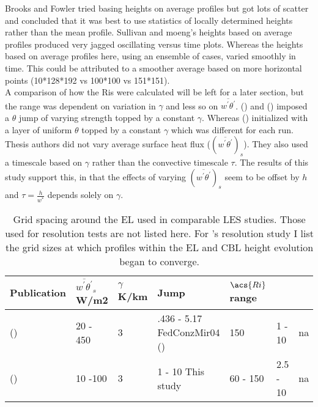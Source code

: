 Brooks and Fowler tried basing heights on average profiles but got lots of scatter and concluded that it was best to use statistics of locally determined heights rather than the mean profile.  Sullivan and moeng's heights based on average profiles produced very jagged oscillating versus time plots. Whereas the heights based on average profiles here, using an ensemble of cases, varied smoothly in time.  This could be attributed to a smoother average based on more horizontal points (10*128*192 vs 100*100 vs 151*151).\\

A comparison of how the \acs{Ri}s were calculated will be left for a later section, but the range was dependent on variation in $\gamma$ and less so on $\overline{w^{'}\theta^{'}}$.  \citeauthor{BrooksFowler2} (\citeyear{BrooksFowler2}) and \citeauthor{SullMoengStev} (\citeyear{SullMoengStev}) imposed a $\theta$ jump of varying strength topped by a constant $\gamma$.  Whereas \citeauthor{FedConzMir04} (\citeyear{FedConzMir04}) initialized with a layer of uniform $\theta$ topped by a constant $\gamma$ which was different for each run.  Thesis authors did not vary average surface heat flux ($(\overline{w^{'}\theta^{'}})_{s}$).  They also used a timescale based on $\gamma$ rather than the convective timescale $\tau$.  The results of this study support this, in that the effects of varying $(\overline{w^{'}\theta^{'}})_{s}$ seem to be offset by $h$ and $\tau = \frac{h}{w^{*}}$ depends solely on $\gamma$.\\    

\begin{table}[htbp]
\caption[]{Grid spacing around the \acs{EL} used in comparable \acs{LES} studies. Those used for resolution tests are not listed here.  For \citeauthor{SullPat}'s \citeyear{SullPat} resolution study I list the grid sizes at which profiles within the \acs{EL} and \acs{CBL} height evolution began to converge.}

    \begin{center}
    \begin{tabular}{ p{5cm} p{2cm} p{2cm} p{2cm} p{2cm}}
Publication & $\overline{w^{'}\theta^{'}}_{s}$ W/m2& $\gamma$ K/km & Jump & $\acs{Ri}$ range \\ \hline
      \citeauthor{SullMoengStev} (\citeyear{SullMoengStev}) & 20 - 450& 3  &.436 - 5.17
      {FedConzMir04} (\citeyear{FedConzMir04}) & 150 & 1 - 10 & na\\ [.3cm] %
      \citeauthor{BrooksFowler2} (\citeyear{BrooksFowler2}) &  10 -100 &  3& 1 - 10 %
      This study & 60 - 150 & 2.5 - 10&na\\ \hline 
      
    \end{tabular}
\label{table:initconditcomp}   
\end{center}    
\end{table}



